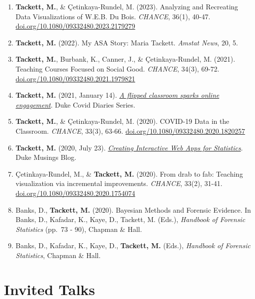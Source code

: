 \documentclass[11pt,dvipsnames]{article}
\begin{document}
\begin{enumerate}
\def\labelenumi{\arabic{enumi}.}
\setcounter{enumi}{11}
\item
  \textbf{Tackett, M.}, \& Çetinkaya-Rundel, M. (2023). Analyzing and
  Recreating Data Visualizations of W.E.B. Du Bois. \emph{CHANCE},
  36(1), 40-47.
  \href{https://doi.org/10.1080/09332480.2023.2179279}{doi.org/10.1080/09332480.2023.2179279}
\item
  \textbf{Tackett, M.} (2022). My ASA Story: Maria Tackett. \emph{Amstat
  News}, 20, 5.
\item
  \textbf{Tackett, M.}, Burbank, K., Canner, J., \& Çetinkaya-Rundel, M.
  (2021). Teaching Courses Focused on Social Good. \emph{CHANCE}, 34(3),
  69-72.
  \href{https://doi.org/10.1080/09332480.2021.1979821}{doi.org/10.1080/09332480.2021.1979821}
\item
  \textbf{Tackett, M.} (2021, January 14).
  \href{https://medium.com/dukeuniversity/a-flipped-classroom-sparks-online-student-engagement-7d6d8bce9694}{\emph{A
  flipped classroom sparks online engagement}}. Duke Covid Diaries
  Series.
\item
  \textbf{Tackett, M.}, \& Çetinkaya-Rundel, M. (2020). COVID-19 Data in
  the Classroom. \emph{CHANCE}, 33(3), 63-66.
  \href{https://doi.org/10.1080/09332480.2020.1820257}{doi.org/10.1080/09332480.2020.1820257}
\item
  \textbf{Tackett, M.} (2020, July 23).
  \href{https://muser.duke.edu/blog/creating-interactive-web-apps-statistics}{\emph{Creating
  Interactive Web Apps for Statistics}}. Duke Musings Blog.
\item
  Çetinkaya-Rundel, M., \& \textbf{Tackett, M.} (2020). From drab to
  fab: Teaching visualization via incremental improvements.
  \emph{CHANCE}, 33(2), 31-41.
  \href{https://doi.org/10.1080/09332480.2020.1754074}{doi.org/10.1080/09332480.2020.1754074}
\item
  Banks, D., \textbf{Tackett, M.} (2020). Bayesian Methods and Forensic
  Evidence. In Banks, D., Kafadar, K., Kaye, D., Tackett, M. (Eds.),
  \emph{Handbook of Forensic Statistics} (pp.~73 - 90), Chapman \& Hall.
\item
  Banks, D., Kafadar, K., Kaye, D., \textbf{Tackett, M.} (Eds.),
  \emph{Handbook of Forensic Statistics}, Chapman \& Hall.
\end{enumerate}

\section{Invited Talks}\label{invited-talks}
\end{document}

